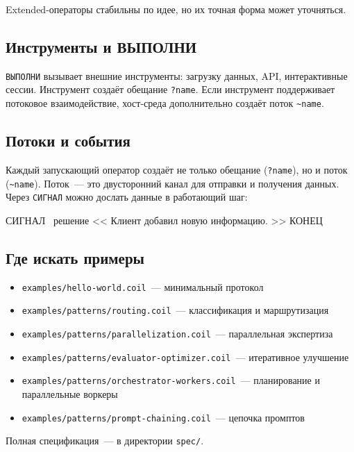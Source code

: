\documentclass[11pt,a4paper]{article}
\newcommand{\ic}[1]{\texttt{\small #1}}
\begin{document}
Extended-операторы стабильны по идее, но их точная форма может уточняться.

\subsection{Инструменты и ВЫПОЛНИ}

\ic{ВЫПОЛНИ} вызывает внешние инструменты: загрузку данных, API, интерактивные сессии. Инструмент создаёт обещание \ic{?name}. Если инструмент поддерживает потоковое взаимодействие, хост-среда дополнительно создаёт поток \ic{\~{}name}.


\subsection{Потоки и события}

Каждый запускающий оператор создаёт не только обещание (\ic{?name}), но и поток (\ic{\~{}name}). Поток~--- это двусторонний канал для отправки и получения данных. Через \ic{СИГНАЛ} можно дослать данные в работающий шаг:

\begin{code}
СИГНАЛ ~решение
  <<
  Клиент добавил новую информацию.
  >>
КОНЕЦ
\end{code}

\subsection{Где искать примеры}

\begin{itemize}[leftmargin=2em]
\item \ic{examples/hello-world.coil}~--- минимальный протокол
\item \ic{examples/patterns/routing.coil}~--- классификация и маршрутизация
\item \ic{examples/patterns/parallelization.coil}~--- параллельная экспертиза
\item \ic{examples/patterns/evaluator-optimizer.coil}~--- итеративное улучшение
\item \ic{examples/patterns/orchestrator-workers.coil}~--- планирование и параллельные воркеры
\item \ic{examples/patterns/prompt-chaining.coil}~--- цепочка промптов
\end{itemize}

Полная спецификация~--- в директории \ic{spec/}.
\end{document}

